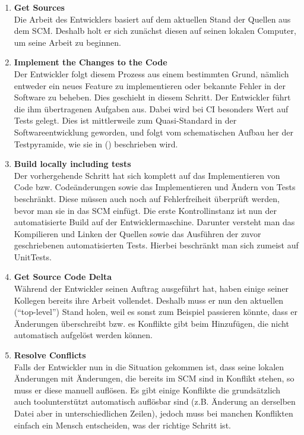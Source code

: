 \begin{enumerate}
	\item \textbf{Get Sources}\\%
		Die Arbeit des Entwicklers basiert auf dem aktuellen Stand der Quellen aus dem SCM. Deshalb holt er sich zunächst diesen auf seinen lokalen Computer, um seine Arbeit zu beginnen.
		\item \textbf{Implement the Changes to the Code}\\%
		Der Entwickler folgt diesem Prozess aus einem bestimmten Grund, nämlich entweder ein neues Feature zu implementieren oder bekannte Fehler in der Software zu beheben. Dies geschieht in diesem Schritt. Der Entwickler führt die ihm übertragenen Aufgaben aus. Dabei wird bei CI besonders Wert auf Tests gelegt. Dies ist mittlerweile zum Quasi-Standard in der Softwareentwicklung geworden, und folgt vom schematischen Aufbau her der Testpyramide, wie sie in (\cite{fowler-Testpyramid}) beschrieben wird.
		\item \textbf{Build locally including tests}\\%
		Der vorhergehende Schritt hat sich komplett auf das Implementieren von Code bzw. Codeänderungen sowie das Implementieren und Ändern von Tests beschränkt. Diese müssen auch noch auf Fehlerfreiheit überprüft werden, bevor man sie in das SCM einfügt. Die erste Kontrollinstanz ist nun der automatisierte Build auf der Entwicklermaschine. Darunter versteht man das Kompilieren und Linken der Quellen sowie das Ausführen der zuvor geschriebenen automatisierten Tests. Hierbei beschränkt man sich zumeist auf UnitTests.
		\item \textbf{Get Source Code Delta}\\%
		Während der Entwickler seinen Auftrag ausgeführt hat, haben einige seiner Kollegen bereits ihre Arbeit vollendet. Deshalb muss er nun den aktuellen ("`top-level"') Stand holen, weil es sonst zum Beispiel passieren könnte, dass er Änderungen überschreibt bzw. es Konflikte gibt beim Hinzufügen, die nicht automatisch aufgelöst werden können.
		\item \textbf{Resolve Conflicts}\\%
		Falls der Entwickler nun in die Situation gekommen ist, dass seine lokalen Änderungen mit Änderungen, die bereits im SCM sind in Konflikt stehen, so muss er diese manuell auflösen. Es gibt einige Konflikte die grundsätzlich auch toolunterstützt automatisch auflösbar sind (z.B. Änderung an derselben Datei aber in unterschiedlichen Zeilen), jedoch muss bei manchen Konflikten einfach ein Mensch entscheiden, was der richtige Schritt ist.

\end{enumerate}
